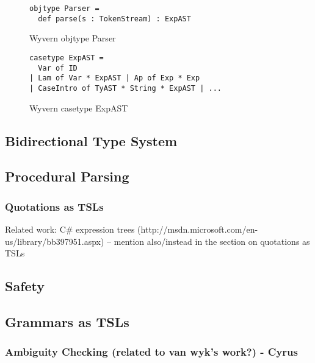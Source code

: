 \begin{figure}
\begin{lstlisting}
objtype Parser = 
  def parse(s : TokenStream) : ExpAST
\end{lstlisting}
\caption{Wyvern objtype Parser}
\label{}
\end{figure}

\begin{figure}
\begin{lstlisting}
casetype ExpAST = 
  Var of ID 
| Lam of Var * ExpAST | Ap of Exp * Exp 
| CaseIntro of TyAST * String * ExpAST | ...
\end{lstlisting}
\caption{Wyvern casetype ExpAST}
\label{}
\end{figure}

\subsection{Bidirectional Type System}
\subsection{Procedural Parsing}
\subsubsection{Quotations as TSLs}
Related work: C\# expression trees (http://msdn.microsoft.com/en-us/library/bb397951.aspx) -- mention also/instead in the section on quotations as TSLs

\subsection{Safety}
\subsection{Grammars as TSLs}
\subsubsection{Ambiguity Checking (related to van wyk's work?) - Cyrus}



